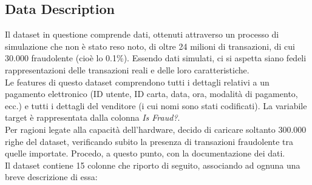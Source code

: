 \documentclass[]{article}
\begin{document}
    \subsection{Data Description}
        Il dataset in questione comprende dati, ottenuti attraverso un processo di simulazione che non è stato reso noto, di oltre 24 milioni di transazioni, di cui 30.000 fraudolente (cioè lo 0.1\%). Essendo dati simulati, ci si aspetta siano fedeli rappresentazioni delle transazioni reali e delle loro caratteristiche.\\
        Le features di questo dataset comprendono tutti i dettagli relativi a un pagamento elettronico (ID utente, ID carta, data, ora, modalità di pagamento, ecc.) e tutti i dettagli del venditore (i cui nomi sono stati codificati). La variabile target è rappresentata dalla colonna \textit{Is Fraud?}.\\
        Per ragioni legate alla capacità dell'hardware, decido di caricare soltanto 300.000 righe del dataset, verificando subito la presenza di transazioni fraudolente tra quelle importate.
        Procedo, a questo punto, con la documentazione dei dati.\\
        Il dataset contiene 15 colonne che riporto di seguito, associando ad ognuna una breve descrizione di essa:
\end{document}
